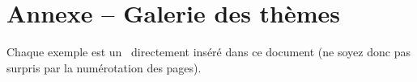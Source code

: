 \documentclass[theme = color]{tutodoc}
\begin{document}
\bgroup
    \section*{Annexe -- Galerie des thèmes}%
    \label{tutodoc-theme-gallery}
\egroup

\bigskip\bigskip

\begin{tdocnote}
    Chaque exemple est un \pdf\ directement inséré dans ce document (ne soyez donc pas surpris par la numérotation des pages).
\end{tdocnote}
\end{document}
